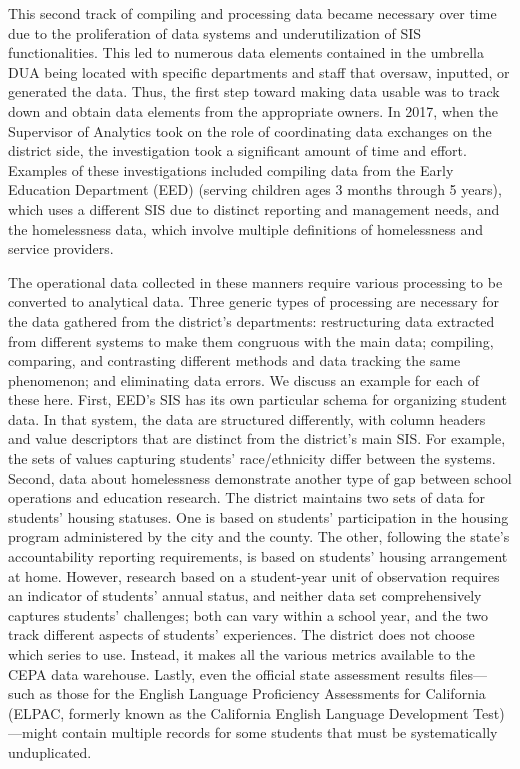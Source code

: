 This second track of compiling and processing data became necessary over time due to the proliferation of data systems and underutilization of SIS functionalities. This led to numerous data elements contained in the umbrella DUA being located with specific departments and staff that oversaw, inputted, or generated the data. Thus, the first step toward making data usable was to track down and obtain data elements from the appropriate owners. In 2017, when the Supervisor of Analytics took on the role of coordinating data exchanges on the district side, the investigation took a significant amount of time and effort. Examples of these investigations included compiling data from the Early Education Department (EED) (serving children ages 3 months through 5 years), which uses a different SIS due to distinct reporting and management needs, and the homelessness data, which involve multiple definitions of homelessness and service providers.

The operational data collected in these manners require various processing to be converted to analytical data. Three generic types of processing are necessary for the data gathered from the district's departments: restructuring data extracted from different systems to make them congruous with the main data; compiling, comparing, and contrasting different methods and data tracking the same phenomenon; and eliminating data errors. We discuss an example for each of these here. First, EED's SIS has its own particular schema for organizing student data. In that system, the data are structured differently, with column headers and value descriptors that are distinct from the district's main SIS. For example, the sets of values capturing students' race/ethnicity differ between the systems. Second, data about homelessness demonstrate another type of gap between school operations and education research. The district maintains two sets of data for students' housing statuses. One is based on students' participation in the housing program administered by the city and the county. The other, following the state's accountability reporting requirements, is based on students' housing arrangement at home. However, research based on a student-year unit of observation requires an indicator of students' annual status, and neither data set comprehensively captures students' challenges; both can vary within a school year, and the two track different aspects of students' experiences. The district does not choose which series to use. Instead, it makes all the various metrics available to the CEPA data warehouse. Lastly, even the official state assessment results files---such as those for the English Language Proficiency Assessments for California (ELPAC, formerly known as the California English Language Development Test)---might contain multiple records for some students that must be systematically unduplicated.

